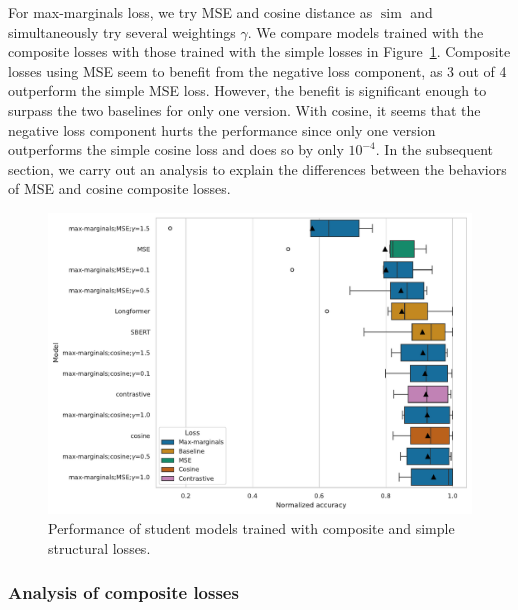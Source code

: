 For max-marginals loss, we try MSE and cosine distance as
$\operatorname{sim}$ and simultaneously try several weightings $\gamma$. We
compare models trained with the composite losses with those trained with the
simple losses in Figure~\ref{fig:structural_composite_vs_simple}. Composite
losses using MSE seem to benefit from the negative loss component, as 3 out of 4 outperform the simple MSE loss. However, the benefit is significant enough to surpass the two baselines for only one version. With cosine, it seems that
  the negative loss component hurts the performance since only one version
  outperforms the simple cosine loss and does so by only $10^{-4}$. In the subsequent section, we carry out an analysis to explain the differences between the behaviors of MSE and cosine composite losses.

\begin{figure}

  \includegraphics[width=\textwidth]{./img/structural_both_losses.pdf}

  \caption{Performance of student models trained with composite and simple
  structural losses.}

  \label{fig:structural_composite_vs_simple}
\end{figure}

\subsubsection{Analysis of composite losses}\label{section:composite_analysis}

